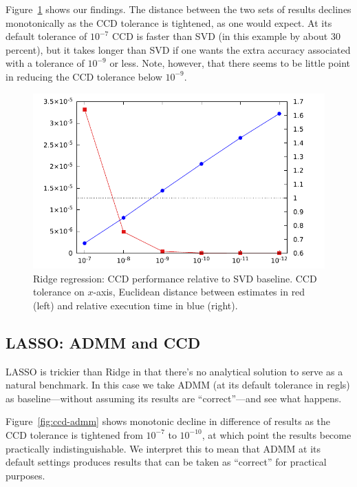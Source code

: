 \documentclass{article}
\begin{document}
Figure~\ref{fig:ccd-svd} shows our findings. The distance between the
two sets of results declines monotonically as the CCD tolerance is
tightened, as one would expect. At its default tolerance of $10^{-7}$
CCD is faster than SVD (in this example by about 30 percent), but it
takes longer than SVD if one wants the extra accuracy associated with
a tolerance of $10^{-9}$ or less. Note, however, that there seems to
be little point in reducing the CCD tolerance below $10^{-9}$.

\begin{figure}[htbp]
\begin{center}
\includegraphics[scale=0.9]{ccd_svd.pdf}
\caption{Ridge regression: CCD performance relative to SVD
  baseline. CCD tolerance on $x$-axis, Euclidean distance between
  estimates in red (left) and relative execution time in blue
  (right).}
\label{fig:ccd-svd}
\end{center}
\end{figure}

\subsection*{LASSO: ADMM and CCD}

LASSO is trickier than Ridge in that there's no analytical solution to
serve as a natural benchmark. In this case we take ADMM (at its
default tolerance in \textsf{regls}) as baseline---without assuming
its results are ``correct''---and see what happens.

Figure~\ref{fig:ccd-admm} shows monotonic decline in difference of
results as the CCD tolerance is tightened from $10^{-7}$ to
$10^{-10}$, at which point the results become practically
indistinguishable. We interpret this to mean that ADMM at its default
settings produces results that can be taken as ``correct'' for
practical purposes.
\end{document}

